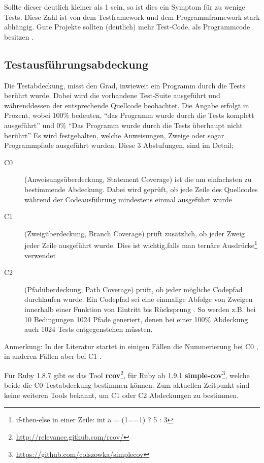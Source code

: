 Sollte dieser deutlich kleiner als 1 sein, so ist dies ein Symptom für zu wenige Tests. Diese Zahl ist von dem Testframework und dem Programmframework stark abhängig. Gute Projekte sollten (deutlich) mehr Test-Code, als Programmcode besitzen \citep[S. 238]{hunt_pragmatic_1999}.

\subsection{Testausführungsabdeckung}
Die Testabdeckung, misst den Grad, inwieweit ein Programm durch die Tests berührt wurde. Dabei wird die vorhandene Test-Suite ausgeführt und währenddessen der entsprechende Quellcode beobachtet. Die Angabe erfolgt in Prozent, wobei 100\% bedeuten, "`das Programm wurde durch die Tests komplett ausgeführt"' und 0\% "`Das Programm wurde durch die Tests überhaupt nicht berührt"'  Es wird festgehalten, welche Anweisungen, Zweige oder sogar Programmpfade ausgeführt wurden. Diese 3 Abstufungen, sind im Detail;
\begin{description}
 \item[C0] (Anweisungsüberdeckung, Statement Coverage) ist die am einfachsten zu bestimmende Abdeckung. Dabei wird geprüft, ob jede Zeile des Quellcodes während der Codeausführung mindestens einmal ausgeführt wurde
 \item[C1] (Zweigüberdeckung, Branch Coverage) prüft zusätzlich, ob jeder Zweig jeder Zeile ausgeführt wurde. Dies ist wichtig,falls man ternäre Ausdrücke\footnote{if-then-else in einer Zeile: int a = (1==1) ? 5 : 3} verwendet
 \item[C2] (Pfadüberdeckung, Path Coverage) prüft, ob jeder mögliche Codepfad durchlaufen wurde. Ein Codepfad sei eine einmalige Abfolge von Zweigen innerhalb einer Funktion von Eintritt bis Rücksprung \citep{steve_cornett_code_1996}. So werden z.B. bei 10 Bedingungen 1024 Pfade generiert, denen bei einer 100\% Abdeckung auch 1024 Tests entgegenstehen müssten.
 \end{description}
 Anmerkung: In der Literatur startet in einigen Fällen die Nummerierung bei C0 \citep{catherine_powell_abakas_2008}, in anderen Fällen aber bei C1 \citep{steve_cornett_code_1996}.

 Für Ruby 1.8.7 gibt es das Tool \textbf{rcov}\footnote{\url{http://relevance.github.com/rcov/}}, für Ruby ab 1.9.1 \textbf{simple-cov}\footnote{\url{https://github.com/colszowka/simplecov}}, welche beide die C0-Testabdeckung bestimmen können. Zum aktuellen Zeitpunkt sind keine weiteren Tools bekannt, um C1 oder C2 Abdeckungen zu bestimmen.
